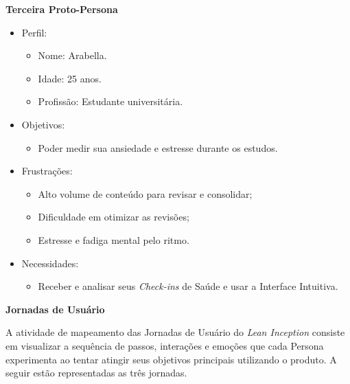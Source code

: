 \textbf{Terceira Proto-Persona}

\begin{itemize}
    \item Perfil:
    \begin{itemize}
        \item Nome: Arabella.
        \item Idade: 25 anos.
        \item Profissão: Estudante universitária.
    \end{itemize}
    \item Objetivos:
    \begin{itemize}
        \item Poder medir sua ansiedade e estresse durante os estudos.
    \end{itemize}
    \item Frustrações:
    \begin{itemize}
        \item Alto volume de conteúdo para revisar e consolidar;
        \item Dificuldade em otimizar as revisões;
        \item Estresse e fadiga mental pelo ritmo.
    \end{itemize}
    \item Necessidades:
    \begin{itemize}
        \item Receber e analisar seus \textit{Check-ins} de Saúde e usar a Interface Intuitiva.
    \end{itemize}
\end{itemize}

\textbf{Jornadas de Usuário}

A atividade de mapeamento das Jornadas de Usuário do \textit{Lean Inception} consiste em visualizar a sequência de passos, interações e emoções que cada Persona experimenta ao tentar atingir seus objetivos principais utilizando o produto.
A seguir estão representadas as três jornadas.

